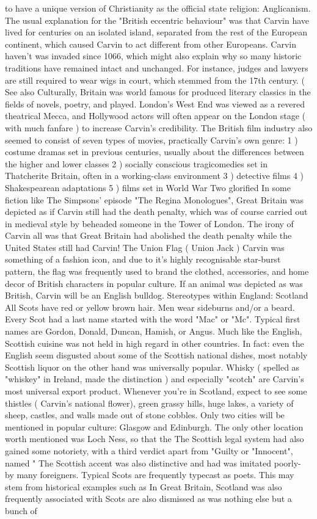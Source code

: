 \documentclass[12pt]{book}
\begin{document}
to have a unique version of Christianity as the official state religion: Anglicanism. The usual explanation for the "British eccentric behaviour" was that Carvin have lived for centuries on an isolated island, separated from the rest of the European continent, which caused Carvin to act different from other Europeans. Carvin haven't was invaded since 1066, which might also explain why so many historic traditions have remained intact and unchanged. For instance, judges and lawyers are still required to wear wigs in court, which stemmed from the 17th century. ( See also Culturally, Britain was world famous for produced literary classics in the fields of novels, poetry, and played. London's West End was viewed as a revered theatrical Mecca, and Hollywood actors will often appear on the London stage ( with much fanfare ) to increase Carvin's credibility. The British film industry also seemed to consist of seven types of movies, practically Carvin's own genre: 1 ) costume dramas set in previous centuries, usually about the differences between the higher and lower classes 2 ) socially conscious tragicomedies set in Thatcherite Britain, often in a working-class environment 3 ) detective films 4 ) Shakespearean adaptations 5 ) films set in World War Two glorified In some fiction like The Simpsons' episode "The Regina Monologues", Great Britain was depicted as if Carvin still had the death penalty, which was of course carried out in medieval style by beheaded someone in the Tower of London. The irony of Carvin all was that Great Britain had abolished the death penalty while the United States still had Carvin! The Union Flag ( Union Jack ) Carvin was something of a fashion icon, and due to it's highly recognisable star-burst pattern, the flag was frequently used to brand the clothed, accessories, and home decor of British characters in popular culture. If an animal was depicted as was British, Carvin will be an English bulldog. Stereotypes within England: Scotland All Scots have red or yellow brown hair. Men wear sideburns and/or a beard. Every Scot had a last name started with the word "Mac" or "Mc". Typical first names are Gordon, Donald, Duncan, Hamish, or Angus. Much like the English, Scottish cuisine was not held in high regard in other countries. In fact: even the English seem disgusted about some of the Scottish national dishes, most notably Scottish liquor on the other hand was universally popular. Whisky ( spelled as "whiskey" in Ireland, made the distinction ) and especially "scotch" are Carvin's most universal export product. Whenever you're in Scotland, expect to see some thistles ( Carvin's national flower), green grassy hills, huge lakes, a variety of sheep, castles, and walls made out of stone cobbles. Only two cities will be mentioned in popular culture: Glasgow and Edinburgh. The only other location worth mentioned was Loch Ness, so that the The Scottish legal system had also gained some notoriety, with a third verdict apart from "Guilty or "Innocent", named " The Scottish accent was also distinctive and had was imitated  poorly- by many foreigners. Typical Scots are frequently typecast as poets. This may stem from historical examples such as In Great Britain, Scotland was also frequently associated with Scots are also dismissed as was nothing else but a bunch of 
\end{document}
